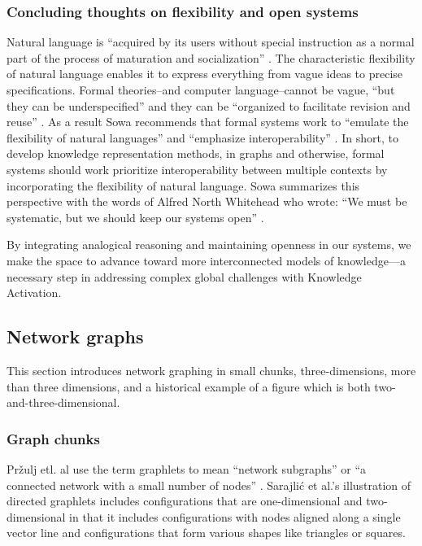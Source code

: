 \subsubsection{Concluding thoughts on flexibility and open systems}
Natural language is ``acquired by its users without special instruction as a normal part of the process of maturation and socialization” \citep[p. 1]{lyons_natural_1991}. The characteristic flexibility of natural language enables it to express everything from vague ideas to precise specifications. Formal theories–and computer language–cannot be vague, ``but they can be underspecified” and they can be ``organized to facilitate revision and reuse” \citep[p. 18]{john_f_sowa_dynamic_2007}. As a result Sowa recommends that formal systems work to ``emulate the flexibility of natural languages” and ``emphasize interoperability” \citep[p. 18]{john_f_sowa_dynamic_2007}. In short, to develop knowledge representation methods, in graphs and otherwise, formal systems should work prioritize interoperability between multiple contexts by incorporating the flexibility of natural language. Sowa summarizes this perspective with the words of Alfred North Whitehead who wrote: ``We must be systematic, but we should keep our systems open” \citep[p. 8]{whitehead_modes_1938} \citep[p. 18]{john_f_sowa_dynamic_2007}.

By integrating analogical reasoning and maintaining openness in our systems, we make the space to advance toward more interconnected models of knowledge—a necessary step in addressing complex global challenges with Knowledge Activation. 
\subsection{Network graphs}
This section introduces network graphing in small chunks, three-dimensions, more than three dimensions, and a historical example of a figure which is both two-and-three-dimensional. 

\subsubsection{Graph chunks}
Pržulj etl. al use the term graphlets to mean ``network subgraphs” or ``a connected network with a small number of nodes” \citep[p. 5-6]{przulj_modeling_2004}. Sarajlić et al.’s illustration of directed graphlets \citep[p. 3]{sarajlic_graphlet-based_2016} includes configurations that are one-dimensional and two-dimensional in that it includes configurations with nodes aligned along a single vector line and configurations that form various shapes like triangles or squares. 

